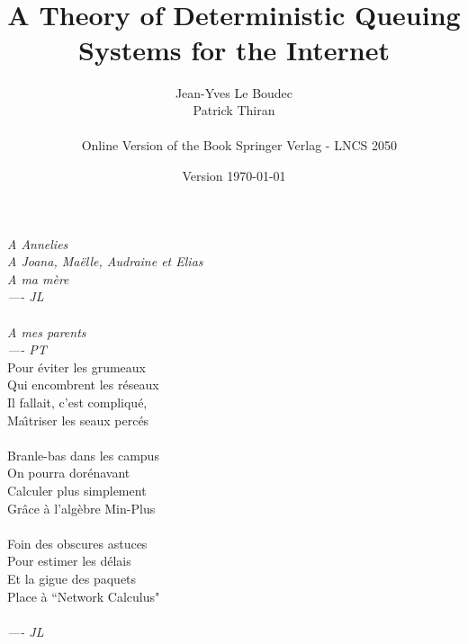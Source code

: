 \documentclass[11pt,twoside,onecolumn,a4paper]{book}
\begin{document}



 \title{
 \\
 ~\\
 A Theory of Deterministic Queuing Systems for the Internet\\
 }
 \author{ {\sc Jean-Yves Le Boudec}  \\{\sc Patrick Thiran}\\
 \vspace{3cm}\\
 ~
 Online Version of the Book Springer Verlag - LNCS 2050
 }

\date{Version \today}

 \maketitle
\frontmatter

\begin{titlepage}
 \begin{center}
 {\it
 A Annelies\\A Joana, Ma\"{e}lle, Audraine et Elias\\
 A ma m\`{e}re\\
 \hspace{1cm} ---- JL\\
 ~\\
 A mes parents\\
 \hspace{1cm} ---- PT\\
 }
 \vspace{7cm}
 Pour \'{e}viter les grumeaux\\
 Qui encombrent les r\'{e}seaux\\
 Il fallait, c'est compliqu\'{e},\\
 Ma\^{\i}triser les seaux perc\'{e}s\\
 ~\\
  Branle-bas dans les campus \\
  On pourra dor\'{e}navant\\
  Calculer plus simplement\\
 Gr\^{a}ce \`{a} l'alg\`{e}bre Min-Plus\\
 ~\\
  Foin des obscures astuces\\
 Pour estimer les d\'{e}lais\\
 Et la gigue des paquets\\
 Place \`{a} ``Network Calculus"\\
 ~\\
 {\it \hspace{2cm} ---- JL}
 \end{center}
\setcounter{page}{5}
\end{titlepage}
\end{document}
